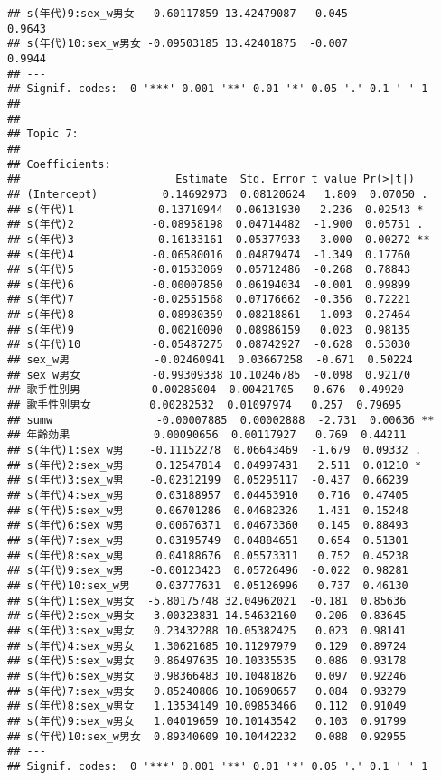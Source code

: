 \documentclass[
]{article}
\begin{document}
\begin{verbatim}
## s(年代)9:sex_w男女  -0.60117859 13.42479087  -0.045              0.9643    
## s(年代)10:sex_w男女 -0.09503185 13.42401875  -0.007              0.9944    
## ---
## Signif. codes:  0 '***' 0.001 '**' 0.01 '*' 0.05 '.' 0.1 ' ' 1
## 
## 
## Topic 7:
## 
## Coefficients:
##                        Estimate  Std. Error t value Pr(>|t|)   
## (Intercept)          0.14692973  0.08120624   1.809  0.07050 . 
## s(年代)1             0.13710944  0.06131930   2.236  0.02543 * 
## s(年代)2            -0.08958198  0.04714482  -1.900  0.05751 . 
## s(年代)3             0.16133161  0.05377933   3.000  0.00272 **
## s(年代)4            -0.06580016  0.04879474  -1.349  0.17760   
## s(年代)5            -0.01533069  0.05712486  -0.268  0.78843   
## s(年代)6            -0.00007850  0.06194034  -0.001  0.99899   
## s(年代)7            -0.02551568  0.07176662  -0.356  0.72221   
## s(年代)8            -0.08980359  0.08218861  -1.093  0.27464   
## s(年代)9             0.00210090  0.08986159   0.023  0.98135   
## s(年代)10           -0.05487275  0.08742927  -0.628  0.53030   
## sex_w男             -0.02460941  0.03667258  -0.671  0.50224   
## sex_w男女           -0.99309338 10.10246785  -0.098  0.92170   
## 歌手性別男          -0.00285004  0.00421705  -0.676  0.49920   
## 歌手性別男女         0.00282532  0.01097974   0.257  0.79695   
## sumw                -0.00007885  0.00002888  -2.731  0.00636 **
## 年齢効果             0.00090656  0.00117927   0.769  0.44211   
## s(年代)1:sex_w男    -0.11152278  0.06643469  -1.679  0.09332 . 
## s(年代)2:sex_w男     0.12547814  0.04997431   2.511  0.01210 * 
## s(年代)3:sex_w男    -0.02312199  0.05295117  -0.437  0.66239   
## s(年代)4:sex_w男     0.03188957  0.04453910   0.716  0.47405   
## s(年代)5:sex_w男     0.06701286  0.04682326   1.431  0.15248   
## s(年代)6:sex_w男     0.00676371  0.04673360   0.145  0.88493   
## s(年代)7:sex_w男     0.03195749  0.04884651   0.654  0.51301   
## s(年代)8:sex_w男     0.04188676  0.05573311   0.752  0.45238   
## s(年代)9:sex_w男    -0.00123423  0.05726496  -0.022  0.98281   
## s(年代)10:sex_w男    0.03777631  0.05126996   0.737  0.46130   
## s(年代)1:sex_w男女  -5.80175748 32.04962021  -0.181  0.85636   
## s(年代)2:sex_w男女   3.00323831 14.54632160   0.206  0.83645   
## s(年代)3:sex_w男女   0.23432288 10.05382425   0.023  0.98141   
## s(年代)4:sex_w男女   1.30621685 10.11297979   0.129  0.89724   
## s(年代)5:sex_w男女   0.86497635 10.10335535   0.086  0.93178   
## s(年代)6:sex_w男女   0.98366483 10.10481826   0.097  0.92246   
## s(年代)7:sex_w男女   0.85240806 10.10690657   0.084  0.93279   
## s(年代)8:sex_w男女   1.13534149 10.09853466   0.112  0.91049   
## s(年代)9:sex_w男女   1.04019659 10.10143542   0.103  0.91799   
## s(年代)10:sex_w男女  0.89340609 10.10442232   0.088  0.92955   
## ---
## Signif. codes:  0 '***' 0.001 '**' 0.01 '*' 0.05 '.' 0.1 ' ' 1
\end{verbatim}
\end{document}
